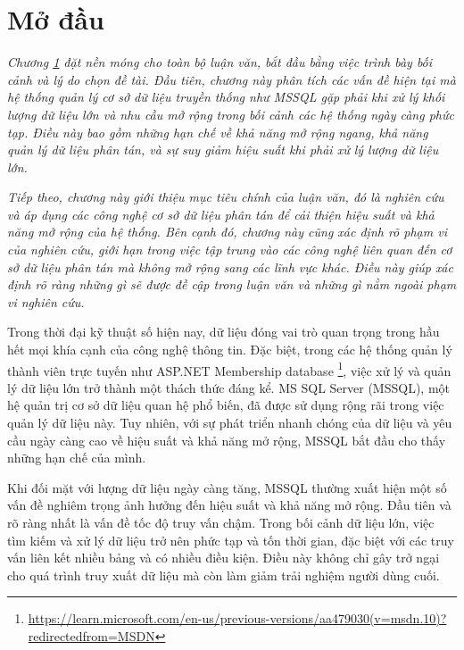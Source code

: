\documentclass{article}[13pt]
\begin{document}
\pagebreak

    
    




\section{Mở đầu}
\label{sec:introduction}

\textit{Chương \ref{sec:introduction} đặt nền móng cho toàn bộ luận văn, bắt đầu bằng việc trình bày bối cảnh và lý do chọn đề tài. Đầu tiên, chương này phân tích các vấn đề hiện tại mà hệ thống quản lý cơ sở dữ liệu truyền thống như MSSQL gặp phải khi xử lý khối lượng dữ liệu lớn và nhu cầu mở rộng trong bối cảnh các hệ thống ngày càng phức tạp. Điều này bao gồm những hạn chế về khả năng mở rộng ngang, khả năng quản lý dữ liệu phân tán, và sự suy giảm hiệu suất khi phải xử lý lượng dữ liệu lớn.}

\textit{Tiếp theo, chương này giới thiệu mục tiêu chính của luận văn, đó là nghiên cứu và áp dụng các công nghệ cơ sở dữ liệu phân tán để cải thiện hiệu suất và khả năng mở rộng của hệ thống. Bên cạnh đó, chương này cũng xác định rõ phạm vi của nghiên cứu, giới hạn trong việc tập trung vào các công nghệ liên quan đến cơ sở dữ liệu phân tán mà không mở rộng sang các lĩnh vực khác. Điều này giúp xác định rõ ràng những gì sẽ được đề cập trong luận văn và những gì nằm ngoài phạm vi nghiên cứu.}


Trong thời đại kỹ thuật số hiện nay, dữ liệu đóng vai trò quan trọng trong hầu hết mọi khía cạnh của công nghệ thông tin. Đặc biệt, trong các hệ thống quản lý thành viên trực tuyến như ASP.NET Membership database \footnote{\url{https://learn.microsoft.com/en-us/previous-versions/aa479030(v=msdn.10)?redirectedfrom=MSDN}}, việc xử lý và quản lý dữ liệu lớn trở thành một thách thức đáng kể. MS SQL Server (MSSQL), một hệ quản trị cơ sở dữ liệu quan hệ phổ biến, đã được sử dụng rộng rãi trong việc quản lý dữ liệu này. Tuy nhiên, với sự phát triển nhanh chóng của dữ liệu và yêu cầu ngày càng cao về hiệu suất và khả năng mở rộng, MSSQL bắt đầu cho thấy những hạn chế của mình.

Khi đối mặt với lượng dữ liệu ngày càng tăng, MSSQL thường xuất hiện một số vấn đề nghiêm trọng ảnh hưởng đến hiệu suất và khả năng mở rộng. Đầu tiên và rõ ràng nhất là vấn đề tốc độ truy vấn chậm. Trong bối cảnh dữ liệu lớn, việc tìm kiếm và xử lý dữ liệu trở nên phức tạp và tốn thời gian, đặc biệt với các truy vấn liên kết nhiều bảng và có nhiều điều kiện. Điều này không chỉ gây trở ngại cho quá trình truy xuất dữ liệu mà còn làm giảm trải nghiệm người dùng cuối.
\end{document}

